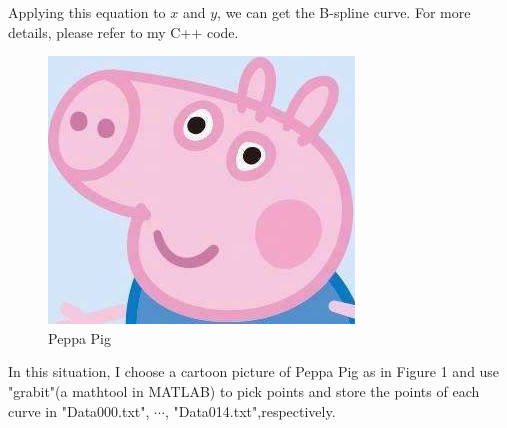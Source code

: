 \documentclass[]{article}
\begin{document}

Applying this equation to $x$ and $y$, we can get the B-spline curve. For more details, please refer to my C++ code.
\par
\begin{figure}[ht]
	\centering
	\includegraphics[scale = 0.8]{fig.jpg}
	\caption{Peppa Pig}
	\label{fig:fig}
\end{figure}
In this situation, I choose a cartoon picture of Peppa Pig as in Figure 1
and use "grabit"(a mathtool in MATLAB) to pick points and store the points of each curve in "Data000.txt", $\cdots$, "Data014.txt",respectively.


\end{document}
